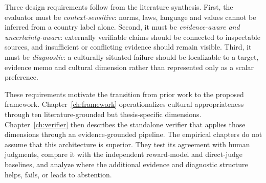 Three design requirements follow from the literature synthesis. First, the evaluator must be \emph{context-sensitive}: norms, laws, language and values cannot be inferred from a country label alone. Second, it must be \emph{evidence-aware and uncertainty-aware}: externally verifiable claims should be connected to inspectable sources, and insufficient or conflicting evidence should remain visible. Third, it must be \emph{diagnostic}: a culturally situated failure should be localizable to a target, evidence memo and cultural dimension rather than represented only as a scalar preference.

These requirements motivate the transition from prior work to the proposed framework. Chapter~\ref{ch:framework} operationalizes cultural appropriateness through ten literature-grounded but thesis-specific dimensions. Chapter~\ref{ch:verifier} then describes the standalone verifier that applies those dimensions through an evidence-grounded pipeline. The empirical chapters do not assume that this architecture is superior. They test its agreement with human judgments, compare it with the independent reward-model and direct-judge baselines, and analyze where the additional evidence and diagnostic structure helps, fails, or leads to abstention.
